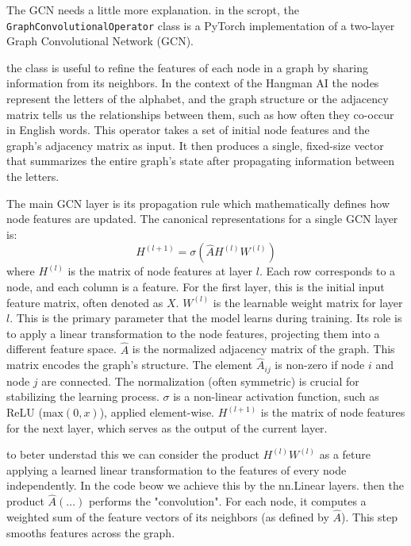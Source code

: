 \documentclass{article}
\begin{document}
The GCN needs a little more explanation.
in the scropt, the \texttt{GraphConvolutionalOperator} class is a PyTorch implementation of a two-layer Graph Convolutional Network (GCN). 

the class is useful to refine the features of each node in a graph by sharing information from its neighbors. In the context of the Hangman AI the nodes represent the letters of the alphabet, and the graph structure or the adjacency matrix tells us the relationships between them, such as how often they co-occur in English words. This operator takes a set of initial node features and the graph's adjacency matrix as input. It then produces a single, fixed-size vector that summarizes the entire graph's state after propagating information between the letters.

The main GCN layer is its propagation rule which mathematically defines how node features are updated. The canonical representations for a single GCN layer is: $$ H^{(l+1)} = \sigma(\hat{A} H^{(l)} W^{(l)}) $$
where $H^{(l)}$ is the matrix of node features at layer $l$. Each row corresponds to a node, and each column is a feature. For the first layer, this is the initial input feature matrix, often denoted as $X$. $W^{(l)}$ is the learnable weight matrix for layer $l$. This is the primary parameter that the model learns during training. Its role is to apply a linear transformation to the node features, projecting them into a different feature space. $\hat{A}$ is the normalized adjacency matrix of the graph. This matrix encodes the graph's structure. The element $\hat{A}_{ij}$ is non-zero if node $i$ and node $j$ are connected. The normalization (often symmetric) is crucial for stabilizing the learning process. $\sigma$ is a non-linear activation function, such as ReLU ($\text{max}(0, x)$), applied element-wise. $H^{(l+1)}$ is the matrix of node features for the next layer, which serves as the output of the current layer.

to beter understad this we can consider the product $H^{(l)} W^{(l)}$ as a feture applying a learned linear transformation to the features of every node independently. In the code beow we achieve this by the nn.Linear layers. then the product $\hat{A} (\dots)$ performs the "convolution". For each node, it computes a weighted sum of the feature vectors of its neighbors (as defined by $\hat{A}$). This step smooths features across the graph.\\
\end{document}
